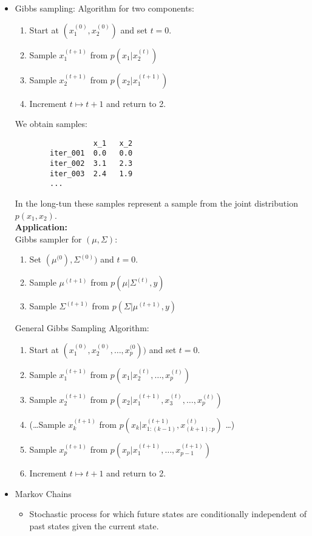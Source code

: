 \documentclass[11pt]{article}
\begin{document}
\begin{itemize}
\item Gibbs sampling: Algorithm for two components:
\begin{enumerate}
    \item Start at $(x_{1}^{(0)},x_{2}^{(0)})$ and set $t=0$.
    \item Sample $x_{1}^{(t+1)}$ from $p(x_{1}|x_{2}^{(t)})$
    \item Sample $x_{2}^{(t+1)}$ from $p(x_{2}|x_{1}^{(t+1)})$
    \item Increment $t\mapsto{}t+1$ and return to 2.
\end{enumerate}
We obtain samples:
\begin{verbatim}
		          x_1   x_2
		iter_001  0.0   0.0
		iter_002  3.1   2.3
		iter_003  2.4   1.9
		...
\end{verbatim}
  In the long-tun these samples represent a sample from the joint distribution $p(x_1,x_2)$.\\
 $ $\\
  \textbf{Application:}\\ 
  $ $\\
  Gibbs sampler for $(\mu,\Sigma)$:
  \begin{enumerate}
    \item Set $(\mu^{(0}),\Sigma^{(0)})$ and $t=0$.
  	\item Sample $\mu^{(t+1)}$ from $p(\mu|\Sigma^{(t)},y)$
  	\item Sample $\Sigma^{(t+1)}$ from $p(\Sigma|\mu^{(t+1)},y)$
  \end{enumerate}
  General Gibbs Sampling Algorithm:
\begin{enumerate}
    \item Start at $(x_{1}^{(0)},x_{2}^{(0)},\ldots,x_{p}^{(0}))$ and set $t=0$.
    \item Sample $x_{1}^{(t+1)}$ from $p(x_{1}|x_{2}^{(t)},\ldots,x_{p}^{(t)})$
    \item Sample $x_{2}^{(t+1)}$ from $p(x_{2}|x_{1}^{(t+1)},x_{3}^{(t)},\ldots,x_{p}^{(t)})$
    \item (\ldots Sample $x_{k}^{(t+1)}$ from $p(x_{k}|x_{1:(k-1)}^{(t+1)},x_{(k+1):p}^{(t)})$ \ldots)
    \item Sample $x_{p}^{(t+1)}$ from $p(x_{p}|x_{1}^{(t+1)},\ldots,x_{p-1}^{(t+1)})$
    \item Increment $t\mapsto{}t+1$ and return to 2.
\end{enumerate}
\item Markov Chains
\begin{itemize}
	\item Stochastic process for which future states are conditionally independent of past states given the current state. 

\end{itemize}
\end{itemize}
\end{document}

